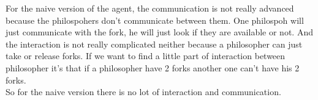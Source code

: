 For the naive version of the agent, the communication is not really advanced because the philospohers don't communicate between them. One philospoh will just communicate with the fork, he will just look if they are available or not. And the interaction is not really complicated neither because a philosopher can just take or release forks. If we want to find a little part of interaction between philosopher it's that if a philosopher have 2 forks another one can't have his 2 forks.\\
So for the naive version there is no lot of interaction and communication.